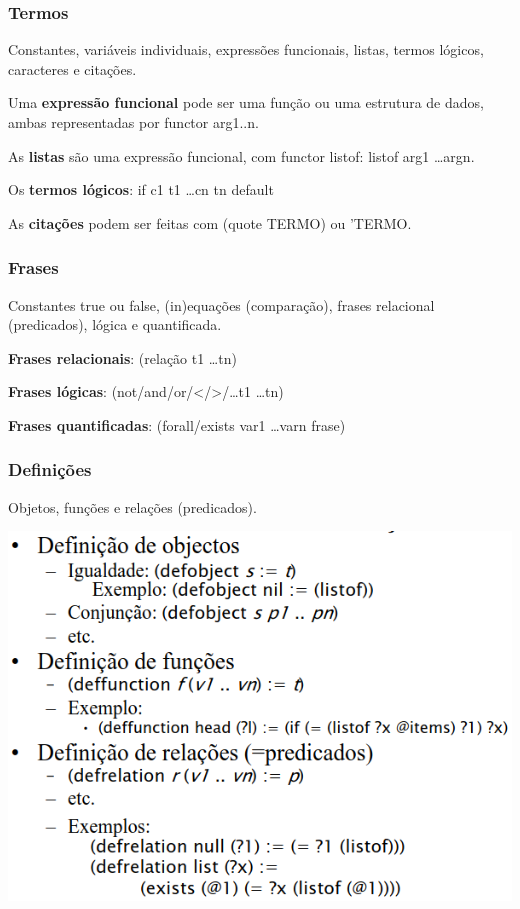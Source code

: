 \documentclass{article}
\begin{document}
\subsubsection*{Termos}

Constantes, variáveis individuais, expressões funcionais, listas, termos lógicos, caracteres e citações.

\vspace{2mm}

Uma \textbf{expressão funcional} pode ser uma função ou uma estrutura de dados, ambas representadas por
functor arg1..n.

As \textbf{listas} são uma expressão funcional, com functor listof:
listof arg1 \dots argn.

Os \textbf{termos lógicos}: if c1 t1 \dots cn tn default

As \textbf{citações} podem ser feitas com
(quote TERMO) ou
'TERMO.

\subsubsection*{Frases}

Constantes true ou false, (in)equações (comparação), frases relacional (predicados), lógica e quantificada.

\textbf{Frases relacionais}:
(relação t1 \dots tn)

\textbf{Frases lógicas}:
(not/and/or/</>/\dots t1 \dots tn)

\textbf{Frases quantificadas}:
(forall/exists var1 \dots varn frase)

\pagebreak

\subsubsection*{Definições}

Objetos, funções e relações (predicados).

\begin{center}
  \includegraphics[scale=0.35]{40}
\end{center}
\end{document}
